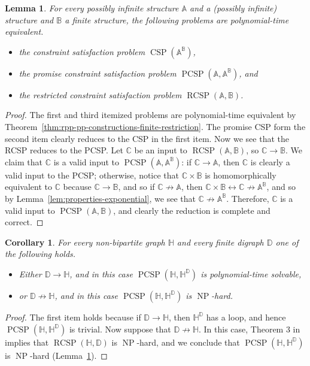 \documentclass{article}
\newtheorem{lemma}[theorem]{Lemma}
\newtheorem{corollary}[theorem]{Corollary}
\theoremstyle{definition}
\theoremstyle{remark}
\DeclareMathOperator{\NP}{NP}
\DeclareMathOperator{\CSP}{CSP}
\DeclareMathOperator{\PCSP}{PCSP}
\DeclareMathOperator{\RCSP}{RCSP}
\newcommand{\bA}{{\mathbb A}}
\newcommand{\bB}{{\mathbb B}}
\newcommand{\bC}{{\mathbb C}}
\newcommand{\bD}{{\mathbb D}}
\newcommand{\bH}{{\mathbb H}}
\begin{document}
\begin{lemma}\label{lem:RCSP-PCSP}
    For every possibly infinite structure $\bA$ and a (possibly infinite) structure and
    $\bB$ a finite structure, the following problems are polynomial-time equivalent.
    \begin{itemize}
        \item the constraint satisfaction problem $\CSP(\bA^\bB)$,
        \item the promise constraint satisfaction problem $\PCSP(\bA,\bA^\bB)$, and
        \item the restricted constraint satisfaction problem $\RCSP(\bA,\bB)$.
    \end{itemize}
\end{lemma}
\begin{proof}
    The first and third itemized problems are polynomial-time equivalent by
    Theorem~\ref{thm:rpp-pp-constructions-finite-restriction}. The promise CSP form the second
    item clearly reduces to the CSP in the first item. Now we see that the RCSP reduces
    to the PCSP. Let $\bC$ be an input
    to $\RCSP(\bA,\bB)$, so $\bC\to \bB$. We claim that $\bC$ is a valid input
    to $\PCSP(\bA,\bA^\bB)$: if $\bC\to \bA$, then $\bC$ is clearly a valid input to the
    PCSP; otherwise, notice that $\bC\times \bB$ is homomorphically equivalent to $\bC$
    because $\bC\to \bB$, and so if $\bC\not\to\bA$, then
    $\bC \times \bB \leftrightarrow \bC \not\to \bA^\bB$, and so by Lemma~\ref{lem:properties-exponential},
    we see that $\bC\not\to \bA^\bB$.
    Therefore, $\bC$ is a valid input to  $\PCSP(\bA,\bB)$, and clearly the reduction is complete
    and correct.
\end{proof}

\begin{corollary}
    For every non-bipartite graph $\bH$ and every finite digraph $\bD$ one of the following holds.
    \begin{itemize}
        \item Either $\bD\to \bH$, and in this case $\PCSP(\bH,\bH^\bD)$ is polynomial-time solvable, 
        \item or $\bD\not\to \bH$, and in this case $\PCSP(\bH,\bH^\bD)$ is $\NP$-hard.
    \end{itemize}
\end{corollary}
\begin{proof}
    The first item holds because if $\bD\to \bH$, then $\bH^\bD$ has a loop, and
    hence  $\PCSP(\bH,\bH^\bD)$ is trivial. Now suppose that $\bD\not\to\bH$. In this case,
    Theorem 3 in~\cite{brewsterDAM156} implies that $\RCSP(\bH,\bD)$ is $\NP$-hard, 
    and we conclude that $\PCSP(\bH,\bH^\bD)$ is $\NP$-hard (Lemma~\ref{lem:RCSP-PCSP}).
\end{proof}
\end{document}
